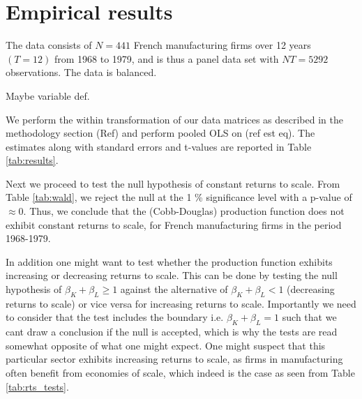 \section{Empirical results}

The data consists of $N = 441$ French manufacturing firms over 12 years $(T=12)$ from 1968 to 1979, and is thus a panel data set with $NT = 5292$ observations. The data is balanced. 

Maybe variable def. 

We perform the within transformation of our data matrices as described in the methodology section (Ref) and perform pooled OLS on (ref est eq). The estimates along with standard errors and t-values are reported in Table \ref{tab:results}. 



Next we proceed to test the null hypothesis of constant returns to scale. From Table \ref{tab:wald}, we reject the null at the 1 \% significance level with a p-value of $\approx 0$. Thus, we conclude that the (Cobb-Douglas) production function does not exhibit constant returns to scale, for French manufacturing firms in the period 1968-1979. 



In addition one might want to test whether the production function exhibits increasing or decreasing returns to scale. This can be done by testing the null hypothesis of $\beta_K + \beta_L \geq 1$ against the alternative of $\beta_K + \beta_L < 1$ (decreasing returns to scale) or vice versa for increasing returns to scale. Importantly we need to consider that the test includes the boundary i.e. $\beta_K + \beta_L = 1$ such that we cant draw a conclusion if the null is accepted, which is why the tests are read somewhat opposite of what one might expect. One might suspect that this particular sector exhibits increasing returns to scale, as firms in manufacturing often benefit from economies of scale, which indeed is the case as seen from Table \ref{tab:rts_tests}.


